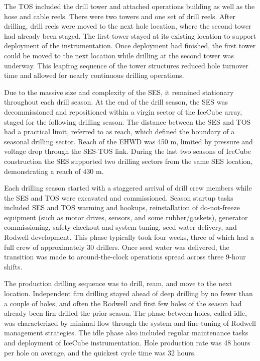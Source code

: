 The TOS included the drill tower and attached operations building as well as the hose and cable reels.  There were two towers and one set of drill reels.  After drilling, drill reels were moved to the next hole location, where the second tower had already been staged.  The first tower stayed at its existing location to support deployment of the instrumentation.  Once deployment had finished, the first tower could be moved to the next location while drilling at the second tower was underway.  This leapfrog sequence of the tower structures reduced hole turnover time and allowed for nearly continuous drilling operations.

Due to the massive size and complexity of the SES, it remained stationary throughout each drill season.  At the end of the drill season, the SES was decommissioned and repositioned within a virgin sector of the IceCube array, staged for the following drilling season.  The distance between the SES and TOS had a practical limit, referred to as reach, which defined the boundary of a seasonal drilling sector.  Reach of the EHWD was 450 m, limited by pressure and voltage drop through the SES-TOS link.  During the last two seasons of IceCube construction the SES supported two drilling sectors from the same SES location, demonstrating a reach of 430 m.

Each drilling season started with a staggered arrival of drill crew members while the SES and TOS were excavated and commissioned.  Season startup tasks included SES and TOS warming and hookups, reinstallation of do-not-freeze equipment (such as motor drives, sensors, and some rubber/gaskets), generator commissioning, safety checkout and system tuning, seed water delivery, and Rodwell development.  This phase typically took four weeks, three of which had a full crew of approximately 30 drillers.  Once seed water was delivered, the transition was made to around-the-clock operations spread across three 9-hour shifts.

The production drilling sequence was to drill, ream, and move to the next location.  Independent firn drilling stayed ahead of deep drilling by no fewer than a couple of holes, and often the Rodwell and first few holes of the season had already been firn-drilled the prior season.  The phase between holes, called idle, was characterized by minimal flow through the system and fine-tuning of Rodwell management strategies.  The idle phase also included regular maintenance tasks and deployment of IceCube instrumentation.  Hole production rate was 48 hours per hole on average, and the quickest cycle time was 32 hours.

